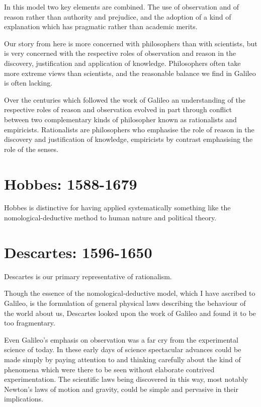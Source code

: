 In this model two key elements are combined.
The use of observation and of reason rather than authority and prejudice, and the adoption of a kind of explanation which has pragmatic rather than academic merits.

Our story from here is more concerned with philosophers than with scientists, but is very concerned with the respective roles of observation and reason in the discovery, justification and application of knowledge.
Philosophers often take more extreme views than scientists, and the reasonable balance we find in Galileo is often lacking.

Over the centuries which followed the work of Galileo an understanding of the respective roles of reason and observation evolved in part through conflict between two complementary kinds of philosopher known as rationalists and empiricists.
Rationalists are philosophers who emphasise the role of reason in the discovery and justification of knowledge, empiricists by contrast emphasising the role of the senses.


\section{Hobbes: 1588-1679}

Hobbes is distinctive for having applied systematically something like the nomological-deductive method to human nature and political theory.

\section{Descartes: 1596-1650}

Descartes is our primary representative of rationalism.

Though the essence of the nomological-deductive model, which I have ascribed to Galileo, is the formulation of general physical laws describing the behaviour of the world about us, Descartes looked upon the work of Galileo and found it to be too fragmentary.

Even Galileo's emphasis on observation was a far cry from the experimental science of today.
In these early days of science spectacular advances could be made simply by paying attention to and thinking carefully about the kind of phenomena which were there to be seen without elaborate contrived experimentation.
The scientific laws being discovered in this way, most notably Newton's laws of motion and gravity, could be simple and pervasive in their implications.


